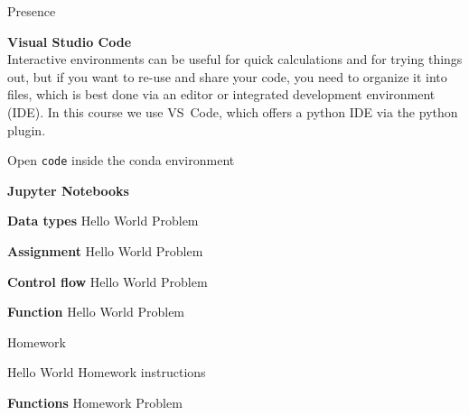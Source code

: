 \documentclass[a4paper]{article}
\begin{document}
\begin{exam}[Presence]{Presence}
\begin{instructions}
    \begin{problem}\textbf{Visual Studio Code}\\
      Interactive environments can be useful for quick calculations and for
      trying things out, but if you want to re-use and share your code, you need
      to organize it into files, which is best done via an editor or integrated
      development environment (IDE). In this course we use VS~Code, which offers
      a python IDE via the python plugin.

      Open \texttt{code} inside the conda environment
    \end{problem}

    \begin{problem}\textbf{Jupyter Notebooks}

    \end{problem}

  \end{instructions}

  \begin{problem}\textbf{Data types}
    Hello World Problem
  \end{problem}
  \begin{problem}\textbf{Assignment}
    Hello World Problem
  \end{problem}
  \begin{problem}\textbf{Control flow}
    Hello World Problem
  \end{problem}
  \begin{problem}\textbf{Function}
    Hello World Problem
  \end{problem}
\end{exam}

\newpage
\begin{exam}[Homework]{Homework}
  \begin{instructions}
    Hello World Homework instructions
  \end{instructions}

  \begin{problem}[3]{\textbf{Functions}}
    Homework Problem
  \end{problem}
\end{exam}
\end{document}
